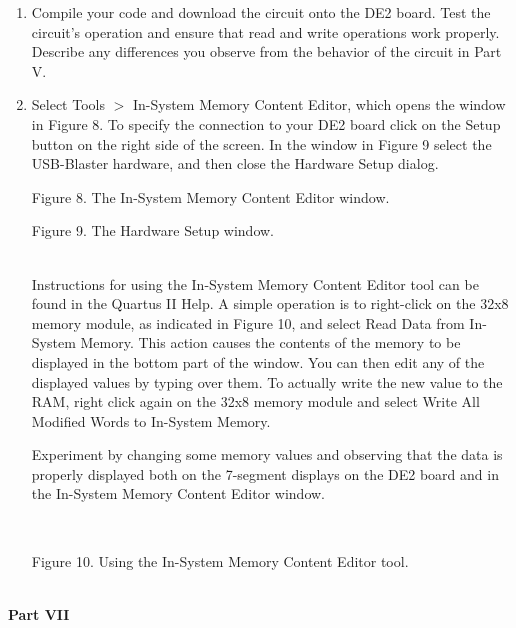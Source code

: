 \documentclass[psfig,10pt,fullpage]{article}
\begin{document}
\begin{enumerate}
\item Compile your code and download the circuit onto the DE2 board. Test the circuit's
operation and ensure that read and write operations work properly. Describe any
differences you observe from the behavior of the circuit in Part V.

\item Select {\sf Tools $>$ In-System Memory Content Editor}, which opens the window in
Figure 8. To specify the connection to your DE2 board click on the {\sf Setup} button on the
right side of the screen. In the window in Figure 9 select the 
{\sf USB-Blaster} hardware, and then close the Hardware Setup dialog.

\begin{figure}[H]
\scriptsize
\centerline{
\hbox{}}
\end{figure}
\centerline{Figure 8.  The In-System Memory Content Editor window.}

\begin{figure}[H]
\scriptsize
\centerline{
\hbox{}}
\end{figure}
\centerline{Figure 9.  The Hardware Setup window.}
~\\

Instructions for using the In-System Memory Content Editor tool can be found in the Quartus II
Help. A simple operation is to right-click on the {\sf 32x8} memory module, as indicated in
Figure 10, and select {\sf Read Data from In-System Memory}. This action causes the
contents of
the memory to be displayed in the bottom part of the window. You can then edit any of the
displayed values by typing over them. To
actually write the new value to the RAM, right click again on the {\sf 32x8} memory
module and select {\sf Write All Modified Words to In-System Memory}.

Experiment by changing some memory values and observing that the data is properly
displayed both on the 7-segment displays on the DE2 board and in the In-System Memory Content 
Editor window.

~\\
\begin{figure}[H]
\scriptsize
\centerline{
\hbox{}}
\end{figure}
\centerline{Figure 10.  Using the In-System Memory Content Editor tool.}

\end{enumerate}

~\\
\noindent
{\bf Part VII}
\end{document}
